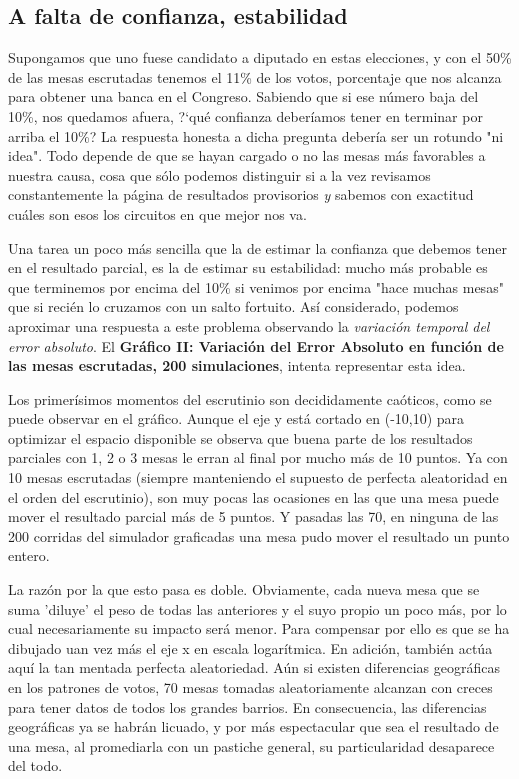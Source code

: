 \documentclass[12pt, a4paper]{article}
\begin{document}
\subsection{A falta de confianza, estabilidad}

Supongamos que uno fuese candidato a diputado en estas elecciones, y con el 50\% de las mesas escrutadas tenemos el 11\% de los votos, porcentaje que nos alcanza para obtener una banca en el Congreso. Sabiendo que si ese n\'umero baja del 10\%, nos quedamos afuera, ?`qu\'e confianza deber\'iamos tener en terminar por arriba el 10\%?
La respuesta honesta a dicha pregunta deber\'ia ser un rotundo "ni idea". Todo depende de que se hayan cargado o no las mesas m\'as favorables a nuestra causa, cosa que s\'olo podemos distinguir si a la vez revisamos constantemente la p\'agina de resultados provisorios \emph{y} sabemos con exactitud cu\'ales son esos los circuitos en que mejor nos va.

Una tarea un poco m\'as sencilla que la de estimar la confianza que debemos tener en el resultado parcial, es la de estimar su estabilidad: mucho m\'as probable es que terminemos por encima del 10\% si venimos por encima "hace muchas mesas" que si reci\'en lo cruzamos con un salto fortuito. As\'i considerado, podemos aproximar una respuesta a este problema observando la \emph{variaci\'on temporal del error absoluto}. El \textbf{Gr\'afico II: Variaci\'on del Error Absoluto en funci\'on de las mesas escrutadas, 200 simulaciones}, intenta representar esta idea.

Los primer\'isimos momentos del escrutinio son decididamente ca\'oticos, como se puede observar en el gr\'afico. Aunque el eje y est\'a cortado en (-10,10) para optimizar el espacio disponible se observa que buena parte de los resultados parciales con 1, 2 o 3 mesas le erran al final por mucho m\'as de 10 puntos. Ya con 10 mesas escrutadas (siempre manteniendo el supuesto de perfecta aleatoridad en el orden del escrutinio), son muy pocas las ocasiones en las que una mesa puede mover el resultado parcial m\'as de 5 puntos. Y pasadas las 70, en ninguna de las 200 corridas del simulador graficadas una mesa pudo mover el resultado un punto entero.

La raz\'on por la que esto pasa es doble. Obviamente, cada nueva mesa que se suma 'diluye' el peso de todas las anteriores y el suyo propio un poco m\'as, por lo cual necesariamente su impacto ser\'a menor. Para compensar por ello es que se ha dibujado uan vez m\'as el eje x en escala logar\'itmica. En adici\'on, tambi\'en act\'ua aqu\'i la tan mentada perfecta aleatoriedad. A\'un si existen diferencias geogr\'aficas en los patrones de votos, 70 mesas tomadas aleatoriamente alcanzan con creces para tener datos de todos los grandes barrios. En consecuencia, las diferencias geogr\'aficas ya se habr\'an licuado, y por m\'as espectacular que sea el resultado de una mesa, al promediarla con un pastiche general, su particularidad desaparece del todo.
\end{document}
